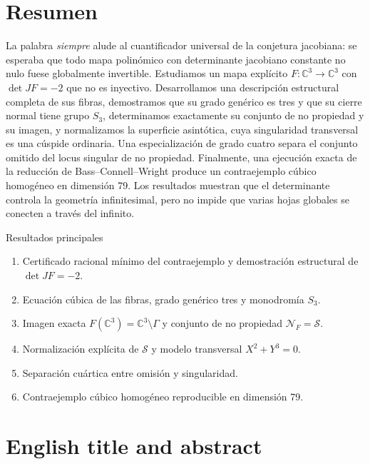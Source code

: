 \documentclass[11pt]{article}
\theoremstyle{definition}
\theoremstyle{remark}
\newcommand{\C}{\mathbb{C}}
\begin{document}
\thispagestyle{plain}
\section*{Resumen}

La palabra \emph{siempre} alude al cuantificador universal de la conjetura
jacobiana: se esperaba que todo mapa polin\'omico con determinante jacobiano
constante no nulo fuese globalmente invertible. Estudiamos un mapa expl\'icito
$F\colon\C^3\to\C^3$ con $\det JF=-2$ que no es inyectivo. Desarrollamos una
descripci\'on estructural completa de sus fibras, demostramos que su grado
gen\'erico es tres y que su cierre normal tiene grupo $S_3$, determinamos
exactamente su conjunto de no propiedad y su imagen, y normalizamos la
superficie asint\'otica, cuya singularidad transversal es una c\'uspide
ordinaria. Una especializaci\'on de grado cuatro separa el conjunto omitido del
locus singular de no propiedad. Finalmente, una ejecuci\'on exacta de la
reducci\'on de Bass--Connell--Wright produce un contraejemplo c\'ubico homog\'eneo
en dimensi\'on 79. Los resultados muestran que el determinante controla la
geometr\'ia infinitesimal, pero no impide que varias hojas globales se conecten
a trav\'es del infinito.

\begin{resultbox}{Resultados principales}
\begin{enumerate}
\item Certificado racional m\'inimo del contraejemplo y demostraci\'on
estructural de $\det JF=-2$.
\item Ecuaci\'on c\'ubica de las fibras, grado gen\'erico tres y monodrom\'ia
$S_3$.
\item Imagen exacta $F(\C^3)=\C^3\setminus\Gamma$ y conjunto de no propiedad
$\mathcal N_F=\mathcal S$.
\item Normalizaci\'on expl\'icita de $\mathcal S$ y modelo transversal
$X^2+Y^3=0$.
\item Separaci\'on cu\'artica entre omisi\'on y singularidad.
\item Contraejemplo c\'ubico homog\'eneo reproducible en dimensi\'on 79.
\end{enumerate}
\end{resultbox}

\section*{English title and abstract}
\end{document}
